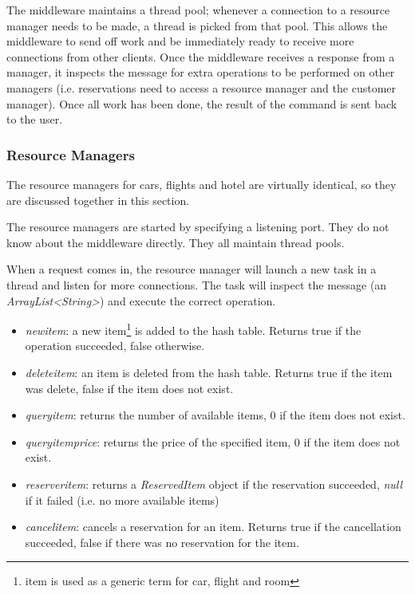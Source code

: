 \documentclass[11pt]{article}
\begin{document}
The middleware maintains a thread pool; whenever a connection to a
resource manager needs to be made, a thread is picked from that pool.
This allows the middleware to send off work and be immediately ready
to receive more connections from other clients.  Once the middleware
receives a response from a manager, it inspects the message for extra
operations to be performed on other managers (i.e. reservations need
to access a resource manager and the customer manager).  Once all work
has been done, the result of the command is sent back to the user.

\subsubsection{Resource Managers}

The resource managers for cars, flights and hotel are virtually
identical, so they are discussed together in this section.

The resource managers are started by specifying a listening port.
They do not know about the middleware directly.  They all maintain
thread pools.

When a request comes in, the resource manager will launch a new task
in a thread and listen for more connections.  The task will inspect
the message (an {\it ArrayList<String>}) and execute the correct
operation.


\begin{itemize}
\item {\it newitem}: a new item\footnote{item is used as a generic
    term for car, flight and room} is added to the hash table.
  Returns true if the operation succeeded, false otherwise.
\item {\it deleteitem}: an item is deleted from the hash table.
  Returns true if the item was delete, false if the item does not exist.
\item {\it queryitem}: returns the number of available items, 0 if the
  item does not exist.
\item {\it queryitemprice}: returns the price of the specified item, 0
  if the item does not exist.
\item {\it reserveritem}: returns a {\it ReservedItem} object if the
  reservation succeeded, {\it null} if it failed (i.e. no more
  available items)
\item {\it cancelitem}: cancels a reservation for an item.  Returns
  true if the cancellation succeeded, false if there was no
  reservation for the item.
\end{itemize}
\end{document}
